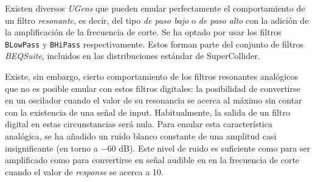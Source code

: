 Existen diversos \textit{UGens} que pueden emular perfectamente el comportamiento de un filtro \textit{resonante}, es decir, del tipo \textit{de paso bajo} o \textit{de paso alto} con la adición de la amplificación de la frecuencia de corte. Se ha optado por usar los filtros \texttt{BLowPass} y \texttt{BHiPass} respectivamente. Estos forman parte del conjunto de filtros \textit{BEQSuite}, incluidos en las distribuciones estándar de SuperCollider. 

Existe, sin embargo, cierto comportamiento de los filtros resonantes analógicos que no es posible emular con estos filtros digitales: la posibilidad de convertirse en un oscilador cuando el valor de su resonancia se acerca al máximo sin contar con la existencia de una señal de input. Habitualmente, la salida de un filtro digital en estas circunstancias será nula. Para emular esta característica analógica, se ha añadido un ruido blanco constante de una amplitud casi insignificante (en torno a $-60$ dB). Este nivel de ruido es suficiente como para ser amplificado como para convertirse en señal audible en en la frecuencia de corte cuando el valor de \textit{response} se acerca a 10.






